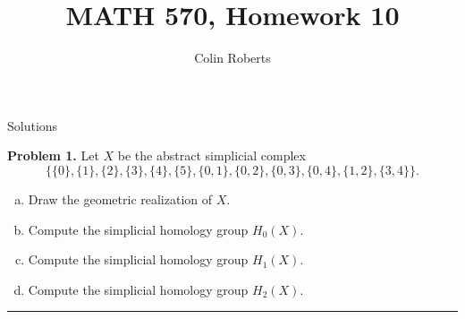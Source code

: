 \documentclass[leqno]{article}
\author{Colin Roberts}
\title{MATH 570, Homework 10}
\theoremstyle{nonumberplain}
\begin{document}
\maketitle
\begin{large}
\begin{center}
Solutions
\end{center}
\end{large}
\pagebreak


\noindent\textbf{Problem 1.}  Let $X$ be the abstract simplicial complex
\[
\{\{0\},\{1\},\{2\},\{3\},\{4\},\{5\},\{0,1\},\{0,2\},\{0,3\},\{0,4\},\{1,2\},\{3,4\}\}.
\]
\begin{enumerate}[(a)]
\item Draw the geometric realization of $X$.
\item Compute the simplicial homology group $H_0(X)$.
\item Compute the simplicial homology group $H_1(X)$.
\item Compute the simplicial homology group $H_2(X)$.
\end{enumerate}

\noindent\rule[0.5ex]{\linewidth}{1pt}
\end{document}
